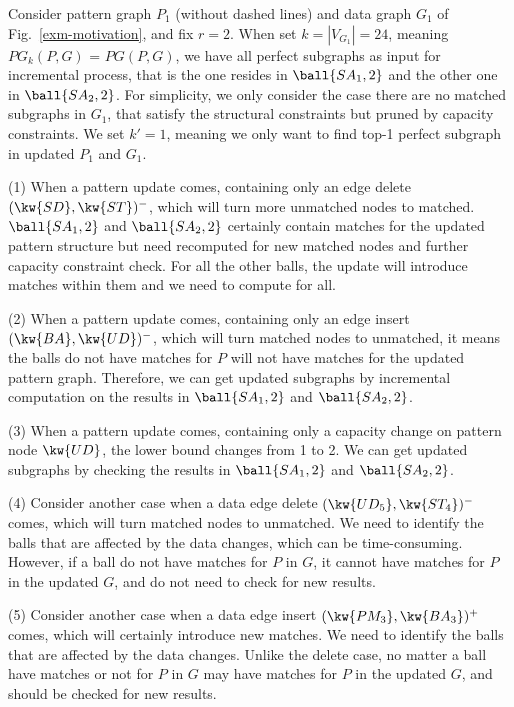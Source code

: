 \begin{example}
\label{exm-pattern-challenge-cp}
Consider pattern graph $P_1$ (without dashed lines) and data graph $G_1$ of Fig.~\ref{exm-motivation}, and fix $r=2$. When set $k=|V_{G_1}|=24$, meaning $PG_k(P,G)$ = $PG(P,G)$, \ie we have all perfect subgraphs as input for incremental process, that is the one resides in $\ball{SA_1, 2}$ and the other one in $\ball{SA_2, 2}$. For simplicity, we only consider the case there are no matched subgraphs in $G_1$, that satisfy the structural constraints but pruned by capacity constraints. We set $k'=1$, meaning we only want to find top-1 perfect subgraph in updated $P_1$ and $G_1$.

(1) When a pattern update comes, containing only an edge delete $(\kw{SD},\kw{ST})^-$, which will turn more unmatched nodes to matched. $\ball{SA_1, 2}$ and $\ball{SA_2, 2}$ certainly contain matches for the updated pattern structure but need recomputed for new matched nodes and further capacity constraint check. For all the other balls, the update will introduce matches within them and we need to compute for all.

(2) When a pattern update comes, containing only an edge insert $(\kw{BA},\kw{UD})^-$, which will turn matched nodes to unmatched, it means the balls do not have matches for $P$ will not have matches for the updated pattern graph. Therefore, we can get updated subgraphs by incremental computation on the results in $\ball{SA_1, 2}$ and $\ball{SA_2, 2}$.

(3) When a pattern update comes, containing only a capacity change on pattern node $\kw{UD}$, the lower bound changes from 1 to 2. We can get updated subgraphs by checking the results in $\ball{SA_1, 2}$ and $\ball{SA_2, 2}$.

(4) Consider another case when a data edge delete $(\kw{UD_5},\kw{ST_4})^-$ comes, which will turn matched nodes to unmatched. We need to identify the balls that are affected by the data changes, which can be time-consuming. However, if a ball do not have matches for $P$ in $G$, it cannot have matches for $P$ in the updated $G$, and do not need to check for new results.

(5) Consider another case when a data edge insert $(\kw{PM_3},\kw{BA_3})^+$ comes, which will certainly introduce new matches. We need to identify the balls that are affected by the data changes. Unlike the delete case, no matter a ball have matches or not for $P$ in $G$ may have matches for $P$ in the updated $G$, and should be checked for new results.



\end{example}



